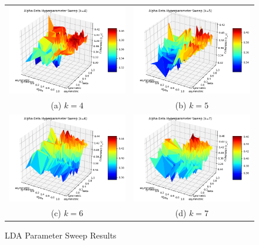 \begin{singlespacing}
\begin{figure}
    \centering
    \begin{tabular}{cc}
      \includegraphics[width=65mm]{Figures/Coherence_Surface_k=4} &
      \includegraphics[width=65mm]{Figures/Coherence_Surface_k=5} \\
    (a) $k=4$ & (b) $k=5$ \\[6pt]
     \includegraphics[width=65mm]{Figures/Coherence_Surface_k=6} &
     \includegraphics[width=65mm]{Figures/Coherence_Surface_k=7} \\
    (c) $k=6$ & (d) $k=7$ \\[6pt]
    \end{tabular}
    \caption[LDA Parameter Sweep Results]{LDA Parameter Sweep Results}
    \label{fig:lda_param_sweep}
\end{figure}
\end{singlespacing}


